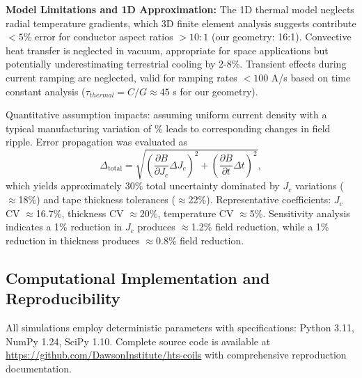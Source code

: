 \documentclass[10pt,twocolumn]{article}
\begin{document}
\textbf{Model Limitations and 1D Approximation:} The 1D thermal model neglects radial temperature gradients, which 3D finite element analysis suggests contribute $<5\%$ error for conductor aspect ratios $>10:1$ (our geometry: 16:1). Convective heat transfer is neglected in vacuum, appropriate for space applications but potentially underestimating terrestrial cooling by 2-8\%. Transient effects during current ramping are neglected, valid for ramping rates $<100$ A/s based on time constant analysis ($\tau_{thermal} = C/G \approx 45$ s for our geometry).

Quantitative assumption impacts: assuming uniform current density with a typical manufacturing variation of \% leads to corresponding changes in field ripple. Error propagation was evaluated as
\begin{equation}
\Delta_{\text{total}} = \sqrt{\left(\frac{\partial B}{\partial J_c}\Delta J_c\right)^2 + \left(\frac{\partial B}{\partial t}\Delta t\right)^2},
\end{equation}
which yields approximately 30\% total uncertainty dominated by $J_c$ variations ($\approx$18\%) and tape thickness tolerances ($\approx$22\%). Representative coefficients: $J_c$ CV $\approx$16.7\%, thickness CV $\approx$20\%, temperature CV $\approx$5\%. Sensitivity analysis indicates a 1\% reduction in $J_c$ produces $\approx$1.2\% field reduction, while a 1\% reduction in thickness produces $\approx$0.8\% field reduction.

\subsection{Computational Implementation and Reproducibility}

All simulations employ deterministic parameters with specifications: Python 3.11, NumPy 1.24, SciPy 1.10. Complete source code is available at \url{https://github.com/DawsonInstitute/hts-coils} with comprehensive reproduction documentation.
\end{document}
